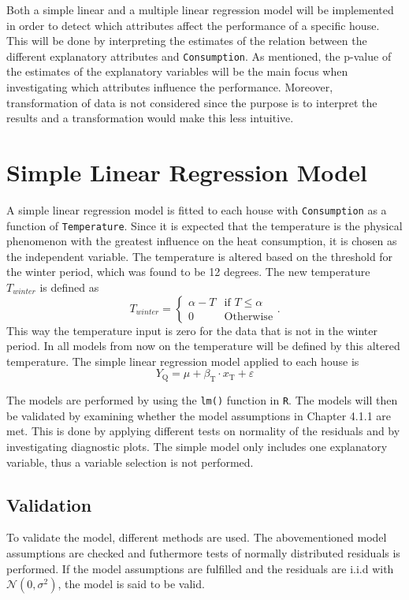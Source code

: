 \noindent Both a simple linear and a multiple linear regression model will be implemented in order to detect which attributes affect the performance of a specific house. This will be done by interpreting the estimates of the relation between the different explanatory attributes and \texttt{Consumption}. As mentioned, the p-value of the estimates of the explanatory variables will be the main focus when investigating which attributes influence the performance. Moreover, transformation of data is not considered since the purpose is to interpret the results and a transformation would make this less intuitive.

\section{Simple Linear Regression Model}
A simple linear regression model is fitted to each house with \texttt{Consumption} as a function of \texttt{Temperature}. Since it is expected that the temperature is the physical phenomenon with the greatest influence on the heat consumption, it is chosen as the independent variable. The temperature is altered based on the threshold for the winter period, which was found to be 12 degrees. The new temperature $T_{winter}$ is defined as
\begin{equation}
    T_{winter} = \begin{cases}
        \alpha - T & \text{if } T\leq \alpha\\
        0 & \text{Otherwise}
    \end{cases}.
    \label{eq:Ttilde}
\end{equation}
This way the temperature input is zero for the data that is not in the winter period. In all models from now on the temperature will be defined by this altered temperature. The simple linear regression model applied to each house is
\begin{equation}
    Y_{\text{Q}} = \mu + \beta_{\text{T}} \cdot x_{\text{T}} + \varepsilon
    \label{eq: simple}
\end{equation}

\noindent The models are performed by using the \texttt{lm()} function in \texttt{R}. The models will then be validated by examining whether the model assumptions in Chapter 4.1.1 are met. This is done by applying different tests on normality of the residuals and by investigating diagnostic plots. The simple model only includes one explanatory variable, thus a variable selection is not performed. 

\subsection{Validation}
To validate the model, different methods are used. The abovementioned model assumptions are checked and futhermore tests of normally distributed residuals is performed. If the model assumptions are fulfilled and the residuals are i.i.d with $\mathcal{N}(0,\sigma^2)$, the model is said to be valid. \\

